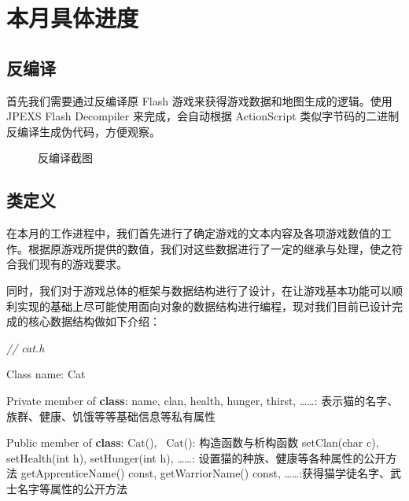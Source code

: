 \documentclass[hyperref,UTF8,a4paper]{ctexart}
\newenvironment{Shaded}{}{}
\newcommand{\AttributeTok}[1]{\textcolor[rgb]{0.49,0.56,0.16}{#1}}
\newcommand{\CommentTok}[1]{\textcolor[rgb]{0.38,0.63,0.69}{\textit{#1}}}
\newcommand{\DataTypeTok}[1]{\textcolor[rgb]{0.56,0.13,0.00}{#1}}
\newcommand{\KeywordTok}[1]{\textcolor[rgb]{0.00,0.44,0.13}{\textbf{#1}}}
\newcommand{\NormalTok}[1]{#1}
\newcommand{\includegraphicx}[1]{\maxsizebox{\textwidth}{\textheight}{\texttt{[image: \#1]}}}
\begin{document}
\hypertarget{ux672cux6708ux5177ux4f53ux8fdbux5ea6}{%
\section{本月具体进度}\label{ux672cux6708ux5177ux4f53ux8fdbux5ea6}}

\hypertarget{ux53cdux7f16ux8bd1}{%
\subsection{反编译}\label{ux53cdux7f16ux8bd1}}

首先我们需要通过反编译原 Flash 游戏来获得游戏数据和地图生成的逻辑。使用
JPEXS Flash Decompiler 来完成，会自动根据 ActionScript
类似字节码的二进制反编译生成伪代码，方便观察。

\begin{figure}[H]
\centering
\includegraphicx{img/decompile.png}
\caption{反编译截图}
\end{figure}

\hypertarget{ux7c7bux5b9aux4e49}{%
\subsection{类定义}\label{ux7c7bux5b9aux4e49}}

在本月的工作进程中，我们首先进行了确定游戏的文本内容及各项游戏数值的工作。根据原游戏所提供的数值，我们对这些数据进行了一定的继承与处理，使之符合我们现有的游戏要求。

同时，我们对于游戏总体的框架与数据结构进行了设计，在让游戏基本功能可以顺利实现的基础上尽可能使用面向对象的数据结构进行编程，现对我们目前已设计完成的核心数据结构做如下介绍：

\begin{Shaded}
\begin{Highlighting}[]
\CommentTok{// cat.h}

\NormalTok{Class name: Cat}
    
\NormalTok{Private member of }\KeywordTok{class}\NormalTok{: }
\NormalTok{    name, clan, health, hunger, thirst, ……: 表示猫的名字、族群、健康、饥饿等等基础信息等私有属性}


\NormalTok{Public member of }\KeywordTok{class}\NormalTok{:}
\NormalTok{    Cat(), ~Cat(): 构造函数与析构函数}
\NormalTok{    setClan(}\DataTypeTok{char}\NormalTok{ c), setHealth(}\DataTypeTok{int}\NormalTok{ h), setHunger(}\DataTypeTok{int}\NormalTok{ h), ……: 设置猫的种族、健康等各种属性的公开方法}
\NormalTok{    getApprenticeName() }\AttributeTok{const}\NormalTok{, getWarriorName() }\AttributeTok{const}\NormalTok{, ……:获得猫学徒名字、武士名字等属性的公开方法}
\end{Highlighting}
\end{Shaded}
\end{document}
